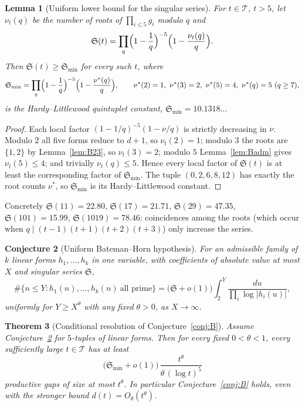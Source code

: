 \documentclass[11pt,a4paper]{article}
\newtheorem{theorem}{Theorem}[section]
\newtheorem{lemma}[theorem]{Lemma}
\newtheorem{conjecture}[theorem]{Conjecture}
\theoremstyle{definition}
\theoremstyle{remark}
\newcommand{\T}{\mathcal{T}}
\newcommand{\Sing}{\mathfrak{S}}
\begin{document}
\begin{lemma}[Uniform lower bound for the singular series]\label{lem:Smin}
For $t\in\T$, $t>5$, let $\nu_t(q)$ be the number of roots of $\prod_{i\le 5} g_i$ modulo $q$ and
\[
\Sing(t) = \prod_q\Bigl(1-\frac1q\Bigr)^{-5}\Bigl(1-\frac{\nu_t(q)}q\Bigr).
\]
Then $\Sing(t)\ge\Sing_{\min}$ for every such $t$, where
\[
\Sing_{\min} = \prod_q\Bigl(1-\frac1q\Bigr)^{-5}\Bigl(1-\frac{\nu^{*}(q)}q\Bigr),\qquad \nu^{*}(2)=1,\ \nu^{*}(3)=2,\ \nu^{*}(5)=4,\ \nu^{*}(q)=5\ (q\ge 7),
\]
is the Hardy--Littlewood quintuplet constant, $\Sing_{\min} = 10.1318\ldots$
\end{lemma}

\begin{proof}
Each local factor $(1-1/q)^{-5}(1-\nu/q)$ is strictly decreasing in $\nu$.
Modulo $2$ all five forms reduce to $d+1$, so $\nu_t(2)=1$; modulo $3$ the roots are $\{1,2\}$ by Lemma~\ref{lem:B23}, so $\nu_t(3)=2$; modulo $5$ Lemma~\ref{lem:Badm} gives $\nu_t(5)\le 4$; and trivially $\nu_t(q)\le 5$.
Hence every local factor of $\Sing(t)$ is at least the corresponding factor of $\Sing_{\min}$.
The tuple $(0,2,6,8,12)$ has exactly the root counts $\nu^{*}$, so $\Sing_{\min}$ is its Hardy--Littlewood constant.
\end{proof}

Concretely $\Sing(11) = 22.80$, $\Sing(17) = 21.71$, $\Sing(29) = 47.35$, $\Sing(101) = 15.99$, $\Sing(1019) = 78.46$: coincidences among the roots (which occur when $q\mid(t-1)(t+1)(t+2)(t+3)$) only increase the series.

\begin{conjecture}[Uniform Bateman--Horn hypothesis]\label{conj:UBH}
For an admissible family of $k$ linear forms $h_1,\dots,h_k$ in one variable, with coefficients of absolute value at most $X$ and singular series $\Sing$,
\[
\#\{n\le Y : h_1(n),\dots,h_k(n)\ \text{all prime}\} = \bigl(\Sing+o(1)\bigr)\int_2^Y\frac{du}{\prod_{i}\log|h_i(u)|},
\]
uniformly for $Y\ge X^\theta$ with any fixed $\theta>0$, as $X\to\infty$.
\end{conjecture}

\begin{theorem}[Conditional resolution of Conjecture~\ref{conj:B}]\label{thm:B}
Assume Conjecture~\ref{conj:UBH} for $5$-tuples of linear forms. Then for every fixed $0<\theta<1$, every sufficiently large $t\in\T$ has at least
\[
\bigl(\Sing_{\min}+o(1)\bigr)\,\frac{t^{\theta}}{\theta\,(\log t)^5}
\]
productive gaps of size at most $t^{\theta}$.
In particular Conjecture~\ref{conj:B} holds, even with the stronger bound $d(t) = O_\theta(t^{\theta})$.
\end{theorem}
\end{document}
